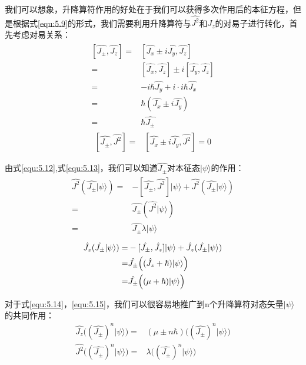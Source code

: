         我们可以想象，升降算符作用的好处在于我们可以获得多次作用后的本征方程，但是根据式\ref{equ:5.9}的形式，我们需要利用升降算符与$\hat{J^2}$和$\hat{J_z} $的对易子进行转化，首先考虑对易关系：
         \begin{align}\label{equ:5.12}
            \begin{split}
                [\hat{J_\pm},\hat{J_z}]=&[\hat{J_x}\pm i\hat{J_y},\hat{J_z}]\\
                =&[\hat{J_x},\hat{J_z}]\pm i[\hat{J_y},\hat{J_z}]\\
                =&-i\hbar \hat{J_y}+i\cdot i\hbar \hat{J_x}\\
                =&\hbar (\hat{J_x}\pm i\hat{J_y})\\
                =&\hbar\hat{J_\pm }
            \end{split}
        \end{align} 
        \begin{align}\label{equ:5.13}
               [\hat{J_\pm},\hat{J^2}] =&[\hat{J_x}\pm i\hat{J_y},\hat{J^2}]=0
        \end{align}
        
        由式\ref{equ:5.12},式\ref{equ:5.13}，我们可以知道$\hat{J_\pm}$对本征态$|\psi\rangle$的作用：
        \begin{align}\label{equ:5.14}
            \begin{split}
                \hat{J^2}(\hat{J_\pm}|\psi \rangle)=&-[\hat{J_\pm},\hat{J^2}]|\psi \rangle +\hat{J^2} (\hat{J_\pm}|\psi \rangle)\\
                =& \hat{J_\pm}(\hat{J^2}|\psi \rangle)\\
                =& \hat{J_\pm}\lambda|\psi \rangle
            \end{split}
        \end{align}
         \begin{align}\protect\label{equ:5.15}
            \begin{split}
                \hat{J_z}(\hat{J_\pm}|\psi \rangle)=&-[\hat{J_\pm},\hat{J_z}]|\psi \rangle +\hat{J_z} (\hat{J_\pm}|\psi \rangle)\\
                =& \hat{J_\pm}\Big((\hat{J_z}+\hbar) |\psi \rangle \Big)\\
                =& \hat{J_\pm} \Big((\mu+\hbar) |\psi \rangle \Big)
            \end{split}
        \end{align}
        
        对于式\ref{equ:5.14}，\ref{equ:5.15}，我们可以很容易地推广到n个升降算符对态矢量$|\psi \rangle$的共同作用：
        \begin{align}
                \hat{J_z}\Big( (\hat{J_\pm} )^n|\psi \rangle \Big)
                =& (\mu \pm n\hbar) \Big((\hat{J_\pm})^n|\psi \rangle \Big)\\
                \hat{J^2}\Big((\hat{J_\pm})^n|\psi \rangle \Big) 
                =&\lambda\Big((\hat{J_\pm})^n|\psi \rangle \Big) \label{equ:5.17}
        \end{align}
        
